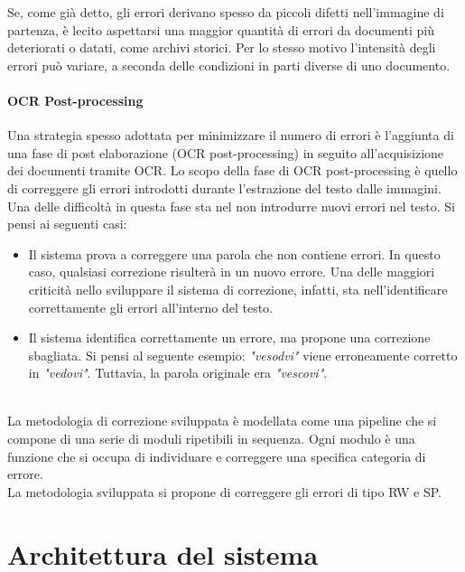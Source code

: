 Se, come già detto, gli errori derivano spesso da piccoli difetti nell'immagine di partenza, è lecito aspettarsi una maggior quantità di errori da documenti più deteriorati o datati, come archivi storici. Per lo stesso motivo l'intensità degli errori può variare, a seconda delle condizioni in parti diverse di uno documento.

\paragraph{OCR Post-processing}
Una strategia spesso adottata per minimizzare il numero di errori è l'aggiunta di
una fase di post elaborazione (OCR post-processing) in seguito all'acquisizione
dei documenti tramite OCR. Lo scopo della fase di OCR post-processing è quello di correggere gli errori introdotti durante l'estrazione del testo dalle immagini. Una delle difficoltà in questa fase sta nel non introdurre nuovi errori nel testo. Si pensi ai seguenti casi:
\begin{itemize}
\item Il sistema prova a correggere una parola che non contiene errori. In questo caso, qualsiasi correzione risulterà in un nuovo errore. Una delle maggiori criticità nello sviluppare il sistema di correzione, infatti, sta nell'identificare correttamente gli errori all'interno del testo.
\item Il sistema identifica correttamente un errore, ma propone una correzione sbagliata. Si pensi al seguente esempio: \textit{"vesodvi"} viene erroneamente corretto in \textit{"vedovi"}. Tuttavia, la parola originale era \textit{"vescovi"}.
\end{itemize}

\ \\
La metodologia di correzione sviluppata è modellata come una pipeline che si compone di una serie di moduli ripetibili in sequenza. Ogni modulo è una funzione che si occupa di individuare e correggere una specifica categoria di errore.\\
La metodologia sviluppata si propone di correggere gli errori di tipo RW e SP.

\section{Architettura del sistema}
\label{sec:met_processo}

